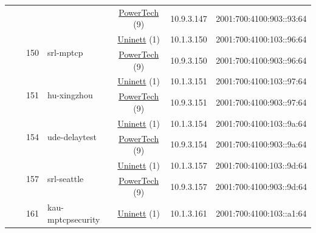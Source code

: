 \begin{small}
\begin{center}
\begin{longtable}{|c|c|c|c|c|c|c|c|}
  &  &  &  & \multicolumn{2}{|c|}{\tiny{\href{http://www.powertech.no}{PowerTech} (9)}} & \tiny{10.9.3.147} & \tiny{2001:700:4100:903::93:64} \\* \cline{3-3}\cline{4-4}\cline{5-5}\cline{6-6}\cline{7-7}\cline{8-8}
  &  & \multirow{2}{*}{\tiny{150}} & \multicolumn{1}{|l|}{\multirow{2}{*}{\tiny{srl-mptcp}}} & \multicolumn{2}{|c|}{\tiny{\href{https://www.uninett.no}{Uninett} (1)}} & \tiny{10.1.3.150} & \tiny{2001:700:4100:103::96:64} \\* \cline{5-5}\cline{6-6}\cline{7-7}\cline{8-8}
  &  &  &  & \multicolumn{2}{|c|}{\tiny{\href{http://www.powertech.no}{PowerTech} (9)}} & \tiny{10.9.3.150} & \tiny{2001:700:4100:903::96:64} \\* \cline{3-3}\cline{4-4}\cline{5-5}\cline{6-6}\cline{7-7}\cline{8-8}
  &  & \multirow{2}{*}{\tiny{151}} & \multicolumn{1}{|l|}{\multirow{2}{*}{\tiny{hu-xingzhou}}} & \multicolumn{2}{|c|}{\tiny{\href{https://www.uninett.no}{Uninett} (1)}} & \tiny{10.1.3.151} & \tiny{2001:700:4100:103::97:64} \\* \cline{5-5}\cline{6-6}\cline{7-7}\cline{8-8}
  &  &  &  & \multicolumn{2}{|c|}{\tiny{\href{http://www.powertech.no}{PowerTech} (9)}} & \tiny{10.9.3.151} & \tiny{2001:700:4100:903::97:64} \\* \cline{3-3}\cline{4-4}\cline{5-5}\cline{6-6}\cline{7-7}\cline{8-8}
  &  & \multirow{2}{*}{\tiny{154}} & \multicolumn{1}{|l|}{\multirow{2}{*}{\tiny{ude-delaytest}}} & \multicolumn{2}{|c|}{\tiny{\href{https://www.uninett.no}{Uninett} (1)}} & \tiny{10.1.3.154} & \tiny{2001:700:4100:103::9a:64} \\* \cline{5-5}\cline{6-6}\cline{7-7}\cline{8-8}
  &  &  &  & \multicolumn{2}{|c|}{\tiny{\href{http://www.powertech.no}{PowerTech} (9)}} & \tiny{10.9.3.154} & \tiny{2001:700:4100:903::9a:64} \\* \cline{3-3}\cline{4-4}\cline{5-5}\cline{6-6}\cline{7-7}\cline{8-8}
  &  & \multirow{2}{*}{\tiny{157}} & \multicolumn{1}{|l|}{\multirow{2}{*}{\tiny{srl-seattle}}} & \multicolumn{2}{|c|}{\tiny{\href{https://www.uninett.no}{Uninett} (1)}} & \tiny{10.1.3.157} & \tiny{2001:700:4100:103::9d:64} \\* \cline{5-5}\cline{6-6}\cline{7-7}\cline{8-8}
  &  &  &  & \multicolumn{2}{|c|}{\tiny{\href{http://www.powertech.no}{PowerTech} (9)}} & \tiny{10.9.3.157} & \tiny{2001:700:4100:903::9d:64} \\* \cline{3-3}\cline{4-4}\cline{5-5}\cline{6-6}\cline{7-7}\cline{8-8}
  &  & \multirow{2}{*}{\tiny{161}} & \multicolumn{1}{|l|}{\multirow{2}{*}{\tiny{kau-mptcpsecurity}}} & \multicolumn{2}{|c|}{\tiny{\href{https://www.uninett.no}{Uninett} (1)}} & \tiny{10.1.3.161} & \tiny{2001:700:4100:103::a1:64} \\* \cline{5-5}\cline{6-6}\cline{7-7}\cline{8-8}

\end{longtable}
\end{center}
\end{small}
